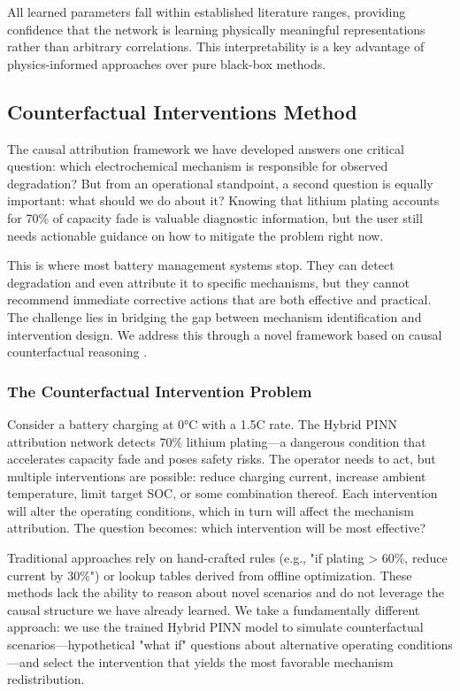 \documentclass[5p,times,authoryear]{elsarticle}
\begin{document}
All learned parameters fall within established literature ranges, providing confidence that the network is learning physically meaningful representations rather than arbitrary correlations. This interpretability is a key advantage of physics-informed approaches over pure black-box methods.




\subsection{Counterfactual Interventions Method}


The causal attribution framework we have developed answers one critical question: which electrochemical mechanism is responsible for observed degradation? But from an operational standpoint, a second question is equally important: what should we do about it? Knowing that lithium plating accounts for 70\% of capacity fade is valuable diagnostic information, but the user still needs actionable guidance on how to mitigate the problem right now.

This is where most battery management systems stop. They can detect degradation and even attribute it to specific mechanisms, but they cannot recommend immediate corrective actions that are both effective and practical. The challenge lies in bridging the gap between mechanism identification and intervention design. We address this through a novel framework based on causal counterfactual reasoning \citep{pearl2009causality,peters2017elements}.

\subsubsection{The Counterfactual Intervention Problem}

Consider a battery charging at 0°C with a 1.5C rate. The Hybrid PINN attribution network detects 70\% lithium plating---a dangerous condition that accelerates capacity fade and poses safety risks. The operator needs to act, but multiple interventions are possible: reduce charging current, increase ambient temperature, limit target SOC, or some combination thereof. Each intervention will alter the operating conditions, which in turn will affect the mechanism attribution. The question becomes: which intervention will be most effective?

Traditional approaches rely on hand-crafted rules (e.g., "if plating > 60\%, reduce current by 30\%") or lookup tables derived from offline optimization. These methods lack the ability to reason about novel scenarios and do not leverage the causal structure we have already learned. We take a fundamentally different approach: we use the trained Hybrid PINN model to simulate counterfactual scenarios---hypothetical "what if" questions about alternative operating conditions---and select the intervention that yields the most favorable mechanism redistribution.
\end{document}

